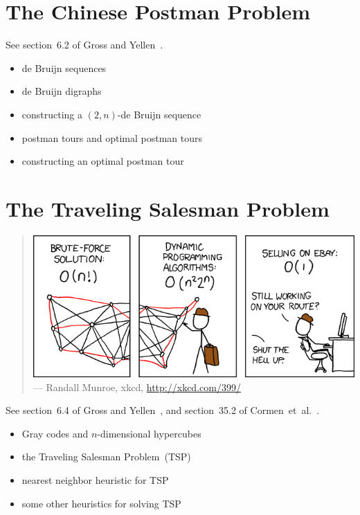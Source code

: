 
\section{The Chinese Postman Problem}

See section~6.2 of Gross and Yellen~\cite{GrossYellen1999}.

\begin{itemize}
\item de Bruijn sequences

\item de Bruijn digraphs

\item constructing a $(2, n)$-de Bruijn sequence

\item postman tours and optimal postman tours

\item constructing an optimal postman tour
\end{itemize}



\section{The Traveling Salesman Problem}

\begin{quote}
\includegraphics[scale=0.5]{image/optimal-traversals/travelling-salesman-problem} \\
\noindent
--- Randall Munroe, xkcd,
\url{http://xkcd.com/399/}
\end{quote}

\noindent
See section~6.4 of Gross and Yellen~\cite{GrossYellen1999}, and
section~35.2 of Cormen~et~al.~\cite{CormenEtAl2001}.

\begin{itemize}
\item Gray codes and $n$-dimensional hypercubes

\item the Traveling Salesman Problem~(TSP)

\item nearest neighbor heuristic for TSP

\item some other heuristics for solving TSP
\end{itemize}
